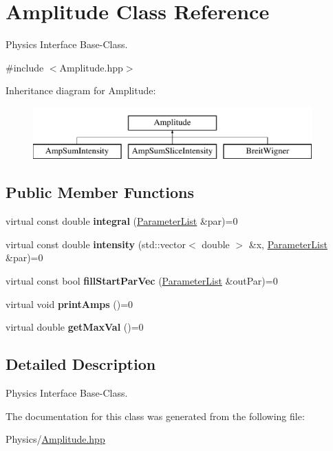 \hypertarget{class_amplitude}{\section{Amplitude Class Reference}
\label{class_amplitude}
}


Physics Interface Base-\/\-Class.  




{\ttfamily \#include $<$Amplitude.\-hpp$>$}

Inheritance diagram for Amplitude\-:\begin{figure}[H]
\begin{center}
\leavevmode
\includegraphics[height=2.000000cm]{class_amplitude}
\end{center}
\end{figure}
\subsection*{Public Member Functions}
\begin{DoxyCompactItemize}
\item 
\hypertarget{class_amplitude_ae0ce9e61d0e567682b4fd0ffe3c01c6c}{virtual const double {\bfseries integral} (\hyperlink{class_parameter_list}{Parameter\-List} \&par)=0}\label{class_amplitude_ae0ce9e61d0e567682b4fd0ffe3c01c6c}

\item 
\hypertarget{class_amplitude_a9c26aadd4b27d678849ce5551f463300}{virtual const double {\bfseries intensity} (std\-::vector$<$ double $>$ \&x, \hyperlink{class_parameter_list}{Parameter\-List} \&par)=0}\label{class_amplitude_a9c26aadd4b27d678849ce5551f463300}

\item 
\hypertarget{class_amplitude_ab5c5185c8d84243e21ac9f116b7d54e8}{virtual const bool {\bfseries fill\-Start\-Par\-Vec} (\hyperlink{class_parameter_list}{Parameter\-List} \&out\-Par)=0}\label{class_amplitude_ab5c5185c8d84243e21ac9f116b7d54e8}

\item 
\hypertarget{class_amplitude_aa1f00245b62ac125eb90cf3c34b4f7d7}{virtual void {\bfseries print\-Amps} ()=0}\label{class_amplitude_aa1f00245b62ac125eb90cf3c34b4f7d7}

\item 
\hypertarget{class_amplitude_aa0ce8c00facb8f134d4b0595c8b151a2}{virtual double {\bfseries get\-Max\-Val} ()=0}\label{class_amplitude_aa0ce8c00facb8f134d4b0595c8b151a2}

\end{DoxyCompactItemize}


\subsection{Detailed Description}
Physics Interface Base-\/\-Class. 

The documentation for this class was generated from the following file\-:\begin{DoxyCompactItemize}
\item 
Physics/\hyperlink{_amplitude_8hpp}{Amplitude.\-hpp}\end{DoxyCompactItemize}
